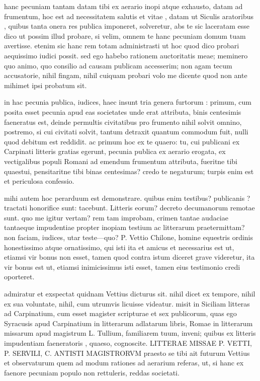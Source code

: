  hanc pecuniam tantam datam tibi ex aerario inopi atque exhausto, datam ad frumentum, hoc est ad necessitatem salutis et vitae , datam ut Siculis aratoribus , quibus tanta onera res publica imponeret, solveretur, abs te sic laceratam esse dico ut possim illud probare, si velim, omnem te hanc pecuniam domum tuam avertisse. etenim sic hanc rem totam administrasti ut hoc quod dico probari aequissimo iudici possit. sed ego habebo rationem auctoritatis meae; meminero quo animo, quo consilio ad causam publicam accesserim; non agam tecum accusatorie, nihil fingam, nihil cuiquam probari volo me dicente quod non ante mihimet ipsi probatum sit.

 in hac pecunia publica, iudices, haec insunt tria genera furtorum : primum, cum posita esset pecunia apud eas societates unde erat attributa, binis centesimis faeneratus est, deinde permultis civitatibus pro frumento nihil solvit omnino, postremo, si cui civitati solvit, tantum detraxit quantum commodum fuit, nulli quod debitum est reddidit. ac primum hoc ex te quaero: tu, cui publicani ex Carpinati litteris gratias egerunt, pecunia publica ex aerario erogata, ex vectigalibus populi Romani ad emendum frumentum attributa, fueritne tibi quaestui, pensitaritne tibi binas centesimas? credo te negaturum; turpis enim est et periculosa confessio.

 mihi autem hoc perarduum est demonstrare. quibus enim testibus? publicanis ? tractati honorifice sunt: tacebunt. Litteris eorum? decreto decumanorum remotae sunt. quo me igitur vertam? rem tam improbam, crimen tantae audaciae tantaeque impudentiae propter inopiam testium ac litterarum praetermittam? non faciam, iudices, utar teste—quo? P. Vettio Chilone, homine equestris ordinis honestissimo atque ornatissimo, qui isti ita et amicus et necessarius est ut, etiamsi vir bonus non esset, tamen quod contra istum diceret grave videretur, ita vir bonus est ut, etiamsi inimicissimus isti esset, tamen eius testimonio credi oporteret.

 admiratur et exspectat quidnam Vettius dicturus sit. nihil dicet ex tempore, nihil ex sua voluntate, nihil, cum utrumvis licuisse videatur. misit in Siciliam litteras ad Carpinatium, cum esset magister scripturae et sex publicorum, quas ego Syracusis apud Carpinatium in litterarum adlatarum libris, Romae in litterarum missarum apud magistrum L. Tullium, familiarem tuum, inveni; quibus ex litteris impudentiam faeneratoris , quaeso, cognoscite. LITTERAE MISSAE P. VETTI, P. SERVILI, C. ANTISTI MAGISTRORVM praesto se tibi ait futurum Vettius et observaturum quem ad modum rationes ad aerarium referas, ut, si hanc ex faenore pecuniam populo non rettuleris, reddas societati.


